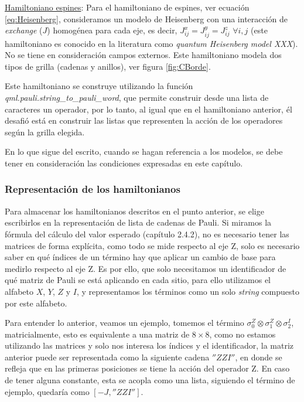 \underline{Hamiltoniano espines}: 
Para el hamiltoniano de espines, ver ecuación \ref{eq:Heisenberg}, consideramos un modelo de Heisenberg con una interacción de \textit{exchange} ($J$) homogénea para cada eje, es decir, $J_{ij}^{x} = J_{ij}^{y} = J_{ij}^{z}$ $\forall i,j$ (este hamiltoniano es conocido en la literatura como \textit{quantum Heisenberg model XXX}). No se tiene en consideración campos externos. Este hamiltoniano modela dos tipos de grilla (cadenas y anillos), ver figura \ref{fig:CBorde}.

Este hamiltoniano se construye utilizando la función \textit{qml.pauli.string\_to\_pauli\_word}, que permite construir desde una lista de caracteres un operador, por lo tanto, al igual que en el hamiltoniano anterior, él desafió está en construir las listas que representen la acción de los operadores según la grilla elegida.

En lo que sigue del escrito, cuando se hagan referencia a los modelos, se debe tener en consideración las condiciones expresadas en este capítulo.

\subsubsection{Representación de los hamiltonianos}
Para almacenar los hamiltonianos descritos en el punto anterior, se elige escribirlos en la representación de lista de cadenas de Pauli. Si miramos la fórmula del cálculo del valor esperado (capítulo 2.4.2), no es necesario tener las matrices de forma explícita, como todo se mide respecto al eje Z, solo es necesario saber en qué índices de un término hay que aplicar un cambio de base para medirlo respecto al eje Z. Es por ello, que solo necesitamos un identificador de qué matriz de Pauli se está aplicando en cada sitio, para ello utilizamos el alfabeto $X$, $Y$, $Z$ y $I$, y representamos los términos como un solo \textit{string} compuesto por este alfabeto.

Para entender lo anterior, veamos un ejemplo, tomemos el término $\sigma_0^Z \otimes \sigma_1^Z \otimes \sigma_2^I$, matricialmente, esto es equivalente a una matriz de $8\times 8$, como no estamos utilizando las matrices y solo nos interesa los índices y el identificador, la matriz anterior puede ser representada como la siguiente cadena $''ZZI''$, en donde se refleja que en las primeras posiciones se tiene la acción del operador Z. En caso de tener alguna constante, esta se acopla como una lista, siguiendo el término de ejemplo, quedaría como $[-J, ''ZZI'']$.

